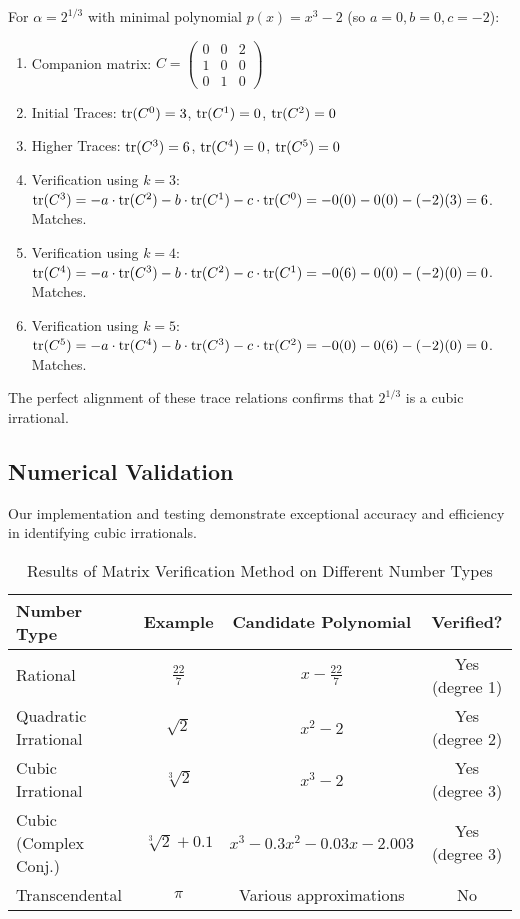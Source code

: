 \begin{example}
For $\alpha = 2^{1/3}$ with minimal polynomial $p(x) = x^3 - 2$ (so $a=0, b=0, c=-2$):
\begin{enumerate}
    \item Companion matrix: $C = \begin{pmatrix} 0 & 0 & 2 \\ 1 & 0 & 0 \\ 0 & 1 & 0 \end{pmatrix}$
    \item Initial Traces: $\operatorname{tr}(C^0) = 3$, $\operatorname{tr}(C^1) = 0$, $\operatorname{tr}(C^2) = 0$
    \item Higher Traces: $\operatorname{tr}(C^3) = 6$, $\operatorname{tr}(C^4) = 0$, $\operatorname{tr}(C^5) = 0$
    \item Verification using $k=3$: $\operatorname{tr}(C^3) = -a \cdot \operatorname{tr}(C^2) - b \cdot \operatorname{tr}(C^1) - c \cdot \operatorname{tr}(C^0) = -0(0) - 0(0) - (-2)(3) = 6$. Matches.
    \item Verification using $k=4$: $\operatorname{tr}(C^4) = -a \cdot \operatorname{tr}(C^3) - b \cdot \operatorname{tr}(C^2) - c \cdot \operatorname{tr}(C^1) = -0(6) - 0(0) - (-2)(0) = 0$. Matches.
    \item Verification using $k=5$: $\operatorname{tr}(C^5) = -a \cdot \operatorname{tr}(C^4) - b \cdot \operatorname{tr}(C^3) - c \cdot \operatorname{tr}(C^2) = -0(0) - 0(6) - (-2)(0) = 0$. Matches.
\end{enumerate}
The perfect alignment of these trace relations confirms that $2^{1/3}$ is a cubic irrational.
\end{example}

\subsection{Numerical Validation}

Our implementation and testing demonstrate exceptional accuracy and efficiency in identifying cubic irrationals.

\begin{table}[htbp]
\centering
\begin{tabular}{|l|c|c|c|}
\hline
\textbf{Number Type} & \textbf{Example} & \textbf{Candidate Polynomial} & \textbf{Verified?} \\
\hline
Rational & $\frac{22}{7}$ & $x - \frac{22}{7}$ & Yes (degree 1) \\
\hline
Quadratic Irrational & $\sqrt{2}$ & $x^2 - 2$ & Yes (degree 2) \\
\hline
Cubic Irrational & $\sqrt[3]{2}$ & $x^3 - 2$ & Yes (degree 3) \\
\hline
Cubic (Complex Conj.) & $\sqrt[3]{2} + 0.1$ & $x^3 - 0.3x^2 - 0.03x - 2.003$ & Yes (degree 3) \\
\hline
Transcendental & $\pi$ & Various approximations & No \\
\hline
\end{tabular}
\caption{Results of Matrix Verification Method on Different Number Types}
\label{tab:matrix_verification_examples}
\end{table}

